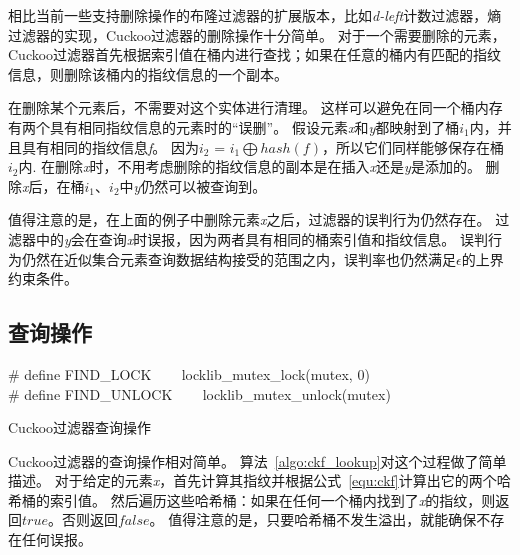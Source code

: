 相比当前一些支持删除操作的布隆过滤器的扩展版本，比如\textit{d-left}计数过滤器，熵过滤器的实现，Cuckoo过滤器的删除操作十分简单。
对于一个需要删除的元素，Cuckoo过滤器首先根据索引值在桶内进行查找；如果在任意的桶内有匹配的指纹信息，则删除该桶内的指纹信息的一个副本。

在删除某个元素后，不需要对这个实体进行清理。
这样可以避免在同一个桶内存有两个具有相同指纹信息的元素时的“误删”。
假设元素\textit{x}和\textit{y}都映射到了桶$i_1$内，并且具有相同的指纹信息\textit{f}。
因为$i_2$ = $i_1\bigoplus hash(f)$，所以它们同样能够保存在桶$i_2$内.
在删除\textit{x}时，不用考虑删除的指纹信息的副本是在插入\textit{x}还是\textit{y}是添加的。
删除\textit{x}后，在桶$i_1$、$i_2$中\textit{y}仍然可以被查询到。

值得注意的是，在上面的例子中删除元素\textit{x}之后，过滤器的误判行为仍然存在。
过滤器中的\textit{y}会在查询\textit{x}时误报，因为两者具有相同的桶索引值和指纹信息。
误判行为仍然在近似集合元素查询数据结构接受的范围之内，误判率也仍然满足$\epsilon$的上界约束条件。

\subsection{查询操作}

\begin{algorithm}[htbp]
\SetAlgoLined
\# define FIND\_LOCK ~~~ locklib\_mutex\_lock(mutex, 0)\\
\# define FIND\_UNLOCK ~~~ locklib\_mutex\_unlock(mutex)\\
\caption{Cuckoo过滤器查询操作}
\label{algo:ckf_lookup}
\end{algorithm}

Cuckoo过滤器的查询操作相对简单。
算法~\ref{algo:ckf_lookup}对这个过程做了简单描述。
对于给定的元素\textit{x}，首先计算其指纹并根据公式~\ref{equ:ckf}计算出它的两个哈希桶的索引值。
然后遍历这些哈希桶：如果在任何一个桶内找到了\textit{x}的指纹，则返回$true$。否则返回$false$。
值得注意的是，只要哈希桶不发生溢出，就能确保不存在任何误报。

